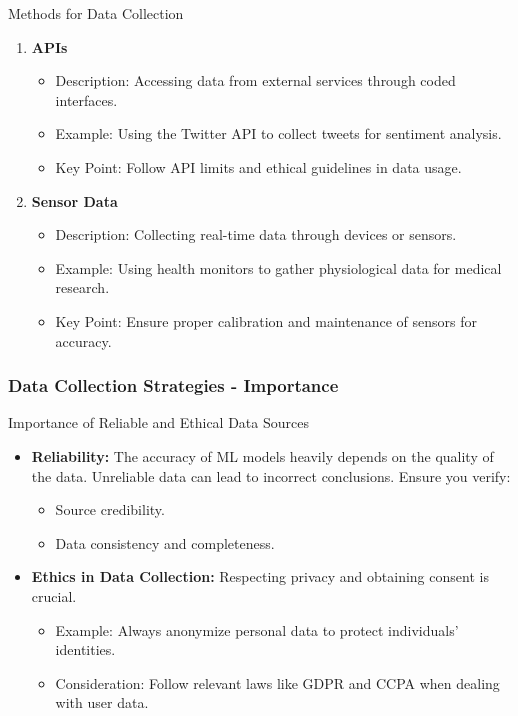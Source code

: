 \documentclass[aspectratio=169]{beamer}
\begin{document}
\begin{frame}[fragile]
\begin{block}{Methods for Data Collection}
\begin{enumerate}
            \item \textbf{APIs}
                \begin{itemize}
                    \item Description: Accessing data from external services through coded interfaces.
                    \item Example: Using the Twitter API to collect tweets for sentiment analysis.
                    \item Key Point: Follow API limits and ethical guidelines in data usage.
                \end{itemize}
                
            \item \textbf{Sensor Data}
                \begin{itemize}
                    \item Description: Collecting real-time data through devices or sensors.
                    \item Example: Using health monitors to gather physiological data for medical research.
                    \item Key Point: Ensure proper calibration and maintenance of sensors for accuracy.
                \end{itemize}
        \end{enumerate}
    \end{block}
\end{frame}

\begin{frame}[fragile]
    \frametitle{Data Collection Strategies - Importance}
    \begin{block}{Importance of Reliable and Ethical Data Sources}
        \begin{itemize}
            \item \textbf{Reliability:} The accuracy of ML models heavily depends on the quality of the data. Unreliable data can lead to incorrect conclusions. Ensure you verify:
                \begin{itemize}
                    \item Source credibility.
                    \item Data consistency and completeness.
                \end{itemize}
                
            \item \textbf{Ethics in Data Collection:} Respecting privacy and obtaining consent is crucial.
                \begin{itemize}
                    \item Example: Always anonymize personal data to protect individuals' identities.
                    \item Consideration: Follow relevant laws like GDPR and CCPA when dealing with user data.
                \end{itemize}
        \end{itemize}
    \end{block}
\end{frame}
\end{document}
